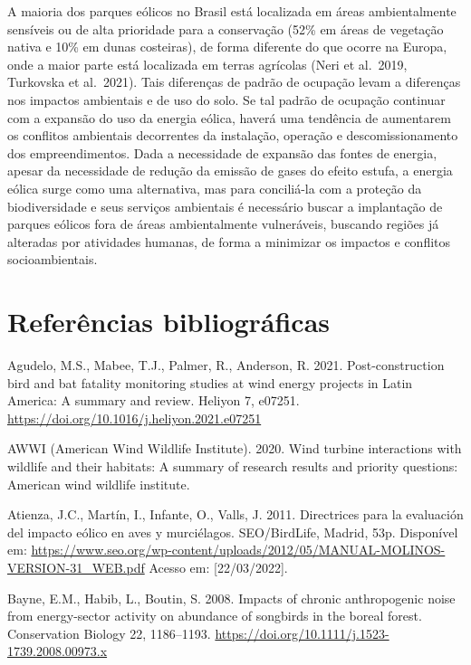 \documentclass[
  oneside]{scrbook}
\begin{document}
A maioria dos parques eólicos no Brasil está localizada em áreas ambientalmente sensíveis ou de alta prioridade para a conservação (52\% em áreas de vegetação nativa e 10\% em dunas costeiras), de forma diferente do que ocorre na Europa, onde a maior parte está localizada em terras agrícolas (Neri et al.~2019, Turkovska et al.~2021). Tais diferenças de padrão de ocupação levam a diferenças nos impactos ambientais e de uso do solo. Se tal padrão de ocupação continuar com a expansão do uso da energia eólica, haverá uma tendência de aumentarem os conflitos ambientais decorrentes da instalação, operação e descomissionamento dos empreendimentos. Dada a necessidade de expansão das fontes de energia, apesar da necessidade de redução da emissão de gases do efeito estufa, a energia eólica surge como uma alternativa, mas para conciliá-la com a proteção da biodiversidade e seus serviços ambientais é necessário buscar a implantação de parques eólicos fora de áreas ambientalmente vulneráveis, buscando regiões já alteradas por atividades humanas, de forma a minimizar os impactos e conflitos socioambientais.

\hypertarget{referuxeancias-bibliogruxe1ficas-3}{%
\section{Referências bibliográficas}\label{referuxeancias-bibliogruxe1ficas-3}}

Agudelo, M.S., Mabee, T.J., Palmer, R., Anderson, R. 2021. Post-construction bird and bat fatality monitoring studies at wind energy projects in Latin America: A summary and review. Heliyon 7, e07251. \url{https://doi.org/10.1016/j.heliyon.2021.e07251}

AWWI (American Wind Wildlife Institute). 2020. Wind turbine interactions with wildlife and their habitats: A summary of research results and priority questions: American wind wildlife institute.

Atienza, J.C., Martín, I., Infante, O., Valls, J. 2011. Directrices para la evaluación del impacto eólico en aves y murciélagos. SEO/BirdLife, Madrid, 53p. Disponível em: \url{https://www.seo.org/wp-content/uploads/2012/05/MANUAL-MOLINOS-VERSION-31_WEB.pdf} Acesso em: {[}22/03/2022{]}.

Bayne, E.M., Habib, L., Boutin, S. 2008. Impacts of chronic anthropogenic noise from energy-sector activity on abundance of songbirds in the boreal forest. Conservation Biology 22, 1186--1193. \url{https://doi.org/10.1111/j.1523-1739.2008.00973.x}
\end{document}
